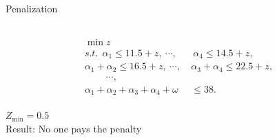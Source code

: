 \documentclass[14pt]{beamer}
\begin{document}
\begin{frame}{Penalization}
\begin{columns}
\begin{column}{7cm}
\begin{shaded}
\vspace{-1.5em}
\begin{eqnarray*}
\begin{aligned}
\min z\\
s.t.~~ \alpha_1 \leq 11.5+z,~\cdots,&~\alpha_4 \leq 14.5+z,\\
\alpha_1 + \alpha_2 \leq 16.5+z,~\cdots,~ &\alpha_3+\alpha_4 \leq 22.5+z,\\
~~~~~~~~~~\cdots,~~&\\
\alpha_1 + \alpha_2 + \alpha_3 + \alpha_4 +\omega &\leq 38.
\end{aligned}
\end{eqnarray*}
\vspace{-1.5em}
\end{shaded}

\centering
$ Z_{\min}=0.5$ \\
\vspace{1em}
Result: No one pays the penalty

\end{column}
\end{columns}
\end{frame}
\end{document}
